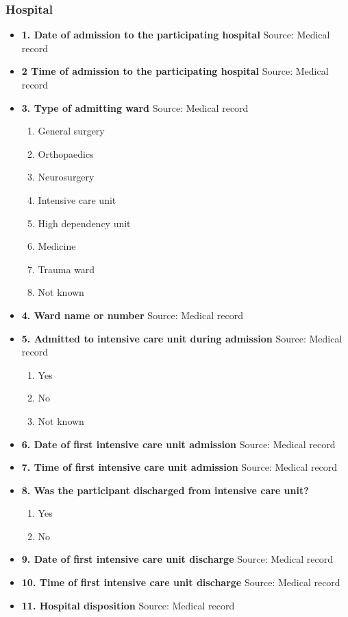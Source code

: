 \documentclass[
]{scrartcl}
\providecommand{\tightlist}{%
  \setlength{\itemsep}{0pt}\setlength{\parskip}{0pt}}\usepackage{longtable,booktabs,array}
\begin{document}
\hypertarget{hospital}{%
\subsubsection{Hospital}\label{hospital}}

\begin{itemize}
\item
  \textbf{1. Date of admission to the participating hospital} Source:
  Medical record
\item
  \textbf{2 Time of admission to the participating hospital} Source:
  Medical record
\item
  \textbf{3. Type of admitting ward} Source: Medical record

  \begin{enumerate}
  \def\labelenumi{\arabic{enumi}.}
  \tightlist
  \item
    General surgery
  \item
    Orthopaedics
  \item
    Neurosurgery
  \item
    Intensive care unit
  \item
    High dependency unit
  \item
    Medicine
  \item
    Trauma ward
  \item
    Not known
  \end{enumerate}
\item
  \textbf{4. Ward name or number} Source: Medical record
\item
  \textbf{5. Admitted to intensive care unit during admission} Source:
  Medical record

  \begin{enumerate}
  \def\labelenumi{\arabic{enumi}.}
  \tightlist
  \item
    Yes
  \item
    No
  \item
    Not known
  \end{enumerate}
\item
  \textbf{6. Date of first intensive care unit admission} Source:
  Medical record
\item
  \textbf{7. Time of first intensive care unit admission} Source:
  Medical record
\item
  \textbf{8. Was the participant discharged from intensive care unit?}

  \begin{enumerate}
  \def\labelenumi{\arabic{enumi}.}
  \tightlist
  \item
    Yes
  \item
    No
  \end{enumerate}
\item
  \textbf{9. Date of first intensive care unit discharge} Source:
  Medical record
\item
  \textbf{10. Time of first intensive care unit discharge} Source:
  Medical record
\item
  \textbf{11. Hospital disposition} Source: Medical record


\end{itemize}
\end{document}
